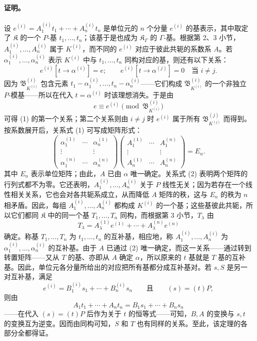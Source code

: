 \documentclass[11pt]{article}
\begin{document}
\paragraph{证明。}
设 $e^{(i)}=A_1^{(i)}t_1+\cdots+A_n^{(i)}t_n$ 是单位元的 $n$ 个分量 $e^{(i)}$ 的基表示，其中取定了 $\mathfrak K$ 的一个 $P$-基 $t_1,\ldots,t_n$；该基于是也成为 $\mathfrak K_\Gamma$ 的 $\Gamma$-基。根据第 2、3 小节，$A_1^{(i)},\ldots,A_n^{(i)}$ 属于 $K^{(i)}$，而不同的 $e^{(i)}$ 对应于彼此共轭的系数系 $A$。若 $\alpha_1^{(i)},\ldots,\alpha_n^{(i)}$ 表示 $K^{(i)}$ 中与 $t_1,\ldots,t_n$ 同构对应的基，则还有以下关系：
\begin{equation}
e^{(i)}[t\to\alpha^{(i)}]=e;
\qquad e^{(i)}[t\to\alpha^{(j)}]=0\quad\text{当 }i\ne j. \tag{1}
\end{equation}
因为 $\mathfrak B_{K^{(i)}}^{(i)}$ 包含元素 $t_1-\alpha_1^{(i)},\ldots,t_n-\alpha_n^{(i)}$——它们构成 $\mathfrak B_{K^{(i)}}^{(i)}$ 的一个非独立 $P$-模基——所以在代入 $t=\alpha^{(i)}$ 时该理想消失。于是由
\[
e\equiv e^{(i)}\pmod{\mathfrak B_{K^{(i)}}^{(i)}}
\]
可得 (1) 的第一个关系；第二个关系则由 $i\ne j$ 时 $e^{(i)}$ 属于所有 $\mathfrak B_{K^{(j)}}^{(j)}$ 而得到。按系数展开后，关系式 (1) 可写成矩阵形式：
\begin{equation}
\begin{pmatrix}
\alpha_1^{(1)}&\cdots&\alpha_n^{(1)}\\
\vdots&&\vdots\\
\alpha_1^{(n)}&\cdots&\alpha_n^{(n)}
\end{pmatrix}
\begin{pmatrix}
A_1^{(1)}&\cdots&A_1^{(n)}\\
\vdots&&\vdots\\
A_n^{(1)}&\cdots&A_n^{(n)}
\end{pmatrix}=E_n. \tag{2}
\end{equation}
其中 $E_n$ 表示单位矩阵；由此，$A$ 已由 $\alpha$ 唯一确定。关系式 (2) 表明两个矩阵的行列式都不为零。它还表明，$A_1^{(i)},\ldots,A_n^{(i)}$ 关于 $P$ 线性无关；因为若存在一个线性相关关系，它也会对各共轭系成立，从而降低 $A$ 矩阵的秩，这与 $E_n$ 的秩为 $n$ 相矛盾。因此，每组 $A_1^{(i)},\ldots,A_n^{(i)}$ 都构成 $K^{(i)}$ 的一个基；这些基彼此共轭，所以它们都同 $\mathfrak K$ 中的同一个基 $T_1,\ldots,T_n$ 同构，而根据第 3 小节，$T_\lambda$ 由
\[
T_\lambda=A_\lambda^{(1)}e^{(1)}+\cdots+A_\lambda^{(n)}e^{(n)}
\]
确定。称基 $T_1,\ldots,T_n$ 为 $t_1,\ldots,t_n$ 的互补基，相应地，称 $A_1^{(i)},\ldots,A_n^{(i)}$ 为 $\alpha_1^{(i)},\ldots,\alpha_n^{(i)}$ 的互补基。由于 $A$ 已通过 (2) 唯一确定，而这一关系——通过转到转置矩阵——又从 $T$ 的基、亦即从 $A$ 确定 $\alpha$，所以原来的 $t$ 基就是 $T$ 基的互补基。因此，单位元各分量所给出的对应把所有基都分成互补基对。若 $s,S$ 是另一对互补基，满足
\[
e^{(i)}=B_1^{(i)}s_1+\cdots+B_n^{(i)}s_n
\qquad\text{且}\qquad (s)=(t)P,
\]
则由
\[
A_1t_1+\cdots+A_nt_n=B_1s_1+\cdots+B_ns_n
\]
——在代入 $(s)=(t)P$ 后作为关于 $t$ 的恒等式——可知，$B,A$ 的变换与 $s,t$ 的变换互为逆变。因而由同构可知，$S$ 和 $T$ 也有同样的关系。至此，该定理的各部分全都得证。
\end{document}

